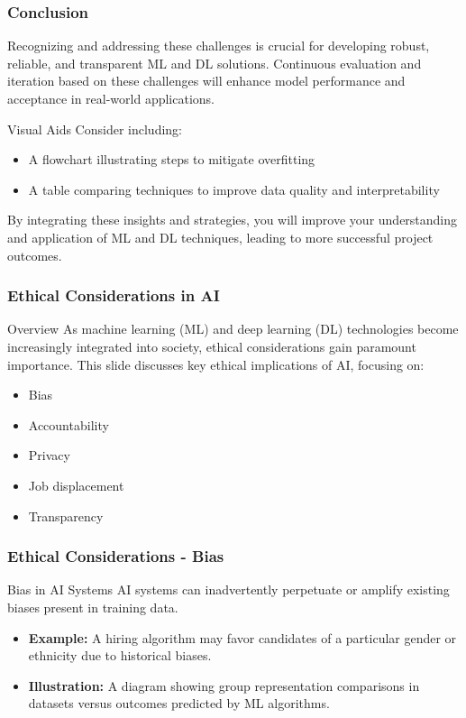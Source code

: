 \documentclass[aspectratio=169]{beamer}
\begin{document}
\begin{frame}[fragile]
    \frametitle{Conclusion}
    Recognizing and addressing these challenges is crucial for developing robust, reliable, and transparent ML and DL solutions. Continuous evaluation and iteration based on these challenges will enhance model performance and acceptance in real-world applications.
    
    \begin{block}{Visual Aids}
        Consider including:
        \begin{itemize}
            \item A flowchart illustrating steps to mitigate overfitting
            \item A table comparing techniques to improve data quality and interpretability
        \end{itemize}
    \end{block}
    
    By integrating these insights and strategies, you will improve your understanding and application of ML and DL techniques, leading to more successful project outcomes.
\end{frame}

\begin{frame}[fragile]
    \frametitle{Ethical Considerations in AI}
    \begin{block}{Overview}
        As machine learning (ML) and deep learning (DL) technologies become increasingly integrated into society, ethical considerations gain paramount importance. This slide discusses key ethical implications of AI, focusing on:
        \begin{itemize}
            \item Bias
            \item Accountability
            \item Privacy
            \item Job displacement
            \item Transparency
        \end{itemize}
    \end{block}
\end{frame}

\begin{frame}[fragile]
    \frametitle{Ethical Considerations - Bias}
    \begin{block}{Bias in AI Systems}
        AI systems can inadvertently perpetuate or amplify existing biases present in training data.
        \begin{itemize}
            \item \textbf{Example:} A hiring algorithm may favor candidates of a particular gender or ethnicity due to historical biases.
            \item \textbf{Illustration:} A diagram showing group representation comparisons in datasets versus outcomes predicted by ML algorithms.
        \end{itemize}
    \end{block}
\end{frame}
\end{document}
